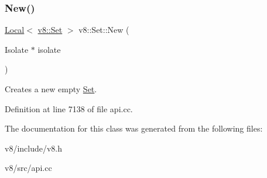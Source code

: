 \mbox{\label{classv8_1_1Set_a4fa9826ffcbb58a49e9855ed86a3abac}} 
\subsubsection{\texorpdfstring{New()}{New()}}
{\footnotesize\ttfamily \mbox{\hyperlink{classv8_1_1Local}{Local}}$<$ \mbox{\hyperlink{classv8_1_1Set}{v8\+::\+Set}} $>$ v8\+::\+Set\+::\+New (\begin{DoxyParamCaption}\item[{Isolate $\ast$}]{isolate }\end{DoxyParamCaption})\hspace{0.3cm}{\ttfamily [static]}}

Creates a new empty \mbox{\hyperlink{classv8_1_1Set}{Set}}. 

Definition at line 7138 of file api.\+cc.



The documentation for this class was generated from the following files\+:\begin{DoxyCompactItemize}
\item 
v8/include/v8.\+h\item 
v8/src/api.\+cc\end{DoxyCompactItemize}
